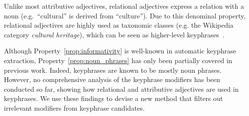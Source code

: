     Unlike most attributive adjectives, relational adjectives express a relation with a noun (e.g.~``cultural'' is derived from ``culture'').
    Due to this denominal property, relational adjectives are highly used as taxonomic classes (e.g. the Wikipedia category \textit{cultural heritage}), which can be seen as higher-level keyphrases~\cite{fatima2011automaticdocumentannotation}.
    
    Although Property~\ref{prop:informativity} is well-known in automatic keyphrase extraction, Property~\ref{prop:noun_phrases} has only been partially covered in previous work.
    Indeed, keyphrases are known to be mostly noun phrases.
    However, no comprehensive analysis of the keyphrase modifiers has been conducted so far, showing how relational and attributive adjectives are used in keyphrases.
    We use these findings to devise a new method that filters out irrelevant modifiers from keyphrase candidates.

